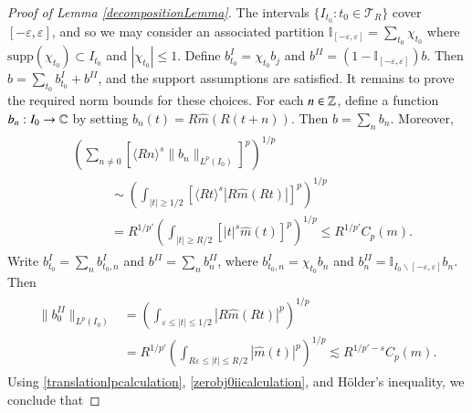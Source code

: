 \begin{proof} [Proof of Lemma \ref{decompositionLemma}]
    The intervals $\{ I_{t_0} : t_0 \in \mathcal{T}_R \}$ cover $[-\varepsilon,\varepsilon]$, and so we may consider an associated partition $\mathbb{I}_{[-\varepsilon,\varepsilon]} = \sum_{t_0} \chi_{t_0}$ where $\text{supp}(\chi_{t_0}) \subset I_{t_0}$ and $|\chi_{t_0}| \leq 1$. Define $b_{t_0}^I = \chi_{t_0} b_j$ and $b^{II} = (1 - \mathbb{I}_{[-\varepsilon,\varepsilon]} ) b$. Then $b = \sum_{t_0} b_{t_0}^I + b^{II}$, and the support assumptions are satisfied. It remains to prove the required norm bounds for these choices. For each $n \in \operatorname{\mathbb{Z}}$, define a function $b_{n}: I_0 \to \operatorname{\mathbb{C}}$ by setting $b_{n}(t) = R \widehat{m}(R (t + n))$. Then $b = \sum_n b_{n}$. Moreover,
    \begin{align} \label{translationlpcalculation}
    \begin{split}
        &\left( \sum_{n \neq 0} \left[ \langle R n \rangle^{s} \| b_{n} \|_{L^p(I_0)} \right]^p \right)^{1/p}\\
        &\quad\quad\quad \sim \left( \int_{|t| \geq 1/2} \left[ \langle R t \rangle^{s} |R \widehat{m}(R t)| \right]^p \right)^{1/p}\\
        &\quad\quad\quad = R^{1/p'} \left( \int_{|t| \geq R/2} \left[ |t|^{s} \widehat{m}(t) \right]^p \right)^{1/p} \leq R^{1/p'} C_p(m).
    \end{split}
    \end{align}
    Write $b_{t_0}^I = \sum_n b_{t_0,n}^I$ and $b^{II} = \sum_n b_{n}^{II}$, where $b_{t_0,n}^I = \chi_{t_0} b_n$ and $b_n^{II} = \mathbb{I}_{I_0 \smallsetminus [-\varepsilon, \varepsilon] } b_{n}$. Then
    \begin{align} \label{zerobj0iicalculation}
    \begin{split}
        \| b_{0}^{II} \|_{L^p(I_0)} &= \left( \int_{\varepsilon \leq |t| \leq 1/2} |R \widehat{m}(R t)|^p \right)^{1/p}\\
        &= R^{1/p'} \left( \int_{R \varepsilon \leq |t| \leq R/2} |\widehat{m}(t)|^p \right)^{1/p} \lesssim R^{1/p' - s} C_p(m).
    \end{split}
    \end{align}
    Using \eqref{translationlpcalculation}, \eqref{zerobj0iicalculation}, and H\"{o}lder's inequality, we conclude that

\end{proof}
